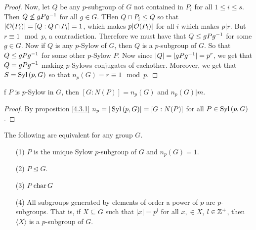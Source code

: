 \begin{proof}
  Now, let $Q$ be any $p$-subgroup of $G$ not contained in  $P_i$ for all  $1
  \leq i \leq s$. Then  $Q \not\leq gPg^{-1}$ for all $g \in G$. THen  $Q
  \cap P_i \leq Q$ so that $|\mathcal{O}(P_i)|=[Q:Q \cap P_i]=1$, which makes
  $p|\mathcal{O}(P_i)|$ for all $i$ which makes  $p|r$. But  $r \equiv 1 \mod{p}$, a
  contradiction. Therefore we must have that $Q \leq gPg^{-1}$ for some $g
  \in G$. Now if $Q$ is any  $p$-Sylow of  $G$, then $Q$ is a $p$-subgroup of
  $G$. So that  $Q \leq gPg^{-1}$ for some other $p$-Sylow $P$. Now since
  $|Q|=|gPg^{-1}|=p^r$, we get that $Q=gPg^{-1}$ making $p$-Sylows
  conjugates of eachother. Moreover, we get that $S=\operatorname{Syl}{(p,G)}$ so that
  $n_p(G)=r \equiv 1 \mod{p}$.
\end{proof}
\begin{corollary}
  f $P$ is $p$-Sylow in $G$, then  $[G:N(P)]=n_p(G)$ and $n_p(G)|m$.
\end{corollary}
\begin{proof}
  By proposition \ref{4.3.1} $n_p=|\operatorname{Syl}{(p,G)}|=[G:N(P)]$ for all $P \in
  \operatorname{Syl}{(p,G)}$.
\end{proof}
\begin{corollary}
  The following are equivalent for any group $G$.
  \begin{enumerate}
    \item[(1)] $P$ is the unique Sylow  $p$-subgroup of  $G$ and
      $n_p(G)=1$.

    \item[(2)] $P \unlhd G$.

    \item[(3)] $P \operatorname{char} G$

    \item[(4)] All subgroups generated by elements of order a power of $p$
      are $p$-subgroups. That is, if $X \subseteq G$ such that
      $|x|=p^l$ for all $x, \in X$,  $l \in \mathbb{Z}^+$, then  $\langle X
      \rangle$ is a $p$-subgroup of  $G$.
  \end{enumerate}
\end{corollary}
